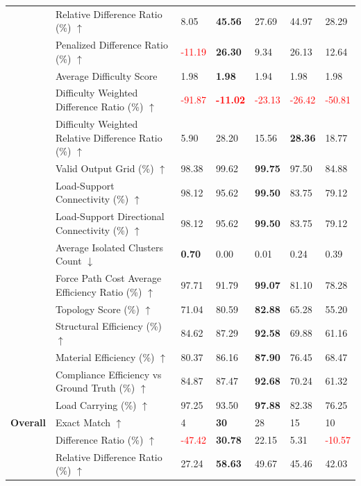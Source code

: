\begin{table}[!h]
{\begin{tabular}{lllllll}
 & Relative Difference Ratio (\%) $\uparrow$ & 8.05 & \textbf{45.56} & 27.69 & 44.97 & 28.29 \\
 & Penalized Difference Ratio (\%) $\uparrow$ & \textcolor{red}{-11.19} & \textbf{26.30} & 9.34 & 26.13 & 12.64 \\
 & Average Difficulty Score & 1.98 & \textbf{1.98} & 1.94 & 1.98 & 1.98 \\
 & Difficulty Weighted Difference Ratio (\%) $\uparrow$ & \textcolor{red}{-91.87} & \textbf{\textcolor{red}{-11.02}} & \textcolor{red}{-23.13} & \textcolor{red}{-26.42} & \textcolor{red}{-50.81} \\
 & Difficulty Weighted Relative Difference Ratio (\%) $\uparrow$ & 5.90 & 28.20 & 15.56 & \textbf{28.36} & 18.77 \\
 & Valid Output Grid (\%) $\uparrow$ & 98.38 & 99.62 & \textbf{99.75} & 97.50 & 84.88 \\
 & Load-Support Connectivity (\%) $\uparrow$ & 98.12 & 95.62 & \textbf{99.50} & 83.75 & 79.12 \\
 & Load-Support Directional Connectivity (\%) $\uparrow$ & 98.12 & 95.62 & \textbf{99.50} & 83.75 & 79.12 \\
 & Average Isolated Clusters Count $\downarrow$ & \textbf{0.70} & 0.00 & 0.01 & 0.24 & 0.39 \\
 & Force Path Cost Average Efficiency Ratio (\%) $\uparrow$ & 97.71 & 91.79 & \textbf{99.07} & 81.10 & 78.28 \\
 & Topology Score (\%) $\uparrow$ & 71.04 & 80.59 & \textbf{82.88} & 65.28 & 55.20 \\
 & Structural Efficiency (\%) $\uparrow$ & 84.62 & 87.29 & \textbf{92.58} & 69.88 & 61.16 \\
 & Material Efficiency (\%) $\uparrow$ & 80.37 & 86.16 & \textbf{87.90} & 76.45 & 68.47 \\
 & Compliance Efficiency vs Ground Truth (\%) $\uparrow$ & 84.87 & 87.47 & \textbf{92.68} & 70.24 & 61.32 \\
 & Load Carrying (\%) $\uparrow$ & 97.25 & 93.50 & \textbf{97.88} & 82.38 & 76.25 \\
\midrule\midrule
\textbf{Overall} & Exact Match $\uparrow$ & 4 & \textbf{30} & 28 & 15 & 10 \\
 & Difference Ratio (\%) $\uparrow$ & \textcolor{red}{-47.42} & \textbf{30.78} & 22.15 & 5.31 & \textcolor{red}{-10.57} \\
 & Relative Difference Ratio (\%) $\uparrow$ & 27.24 & \textbf{58.63} & 49.67 & 45.46 & 42.03 \\

\end{tabular}}
\end{table}

